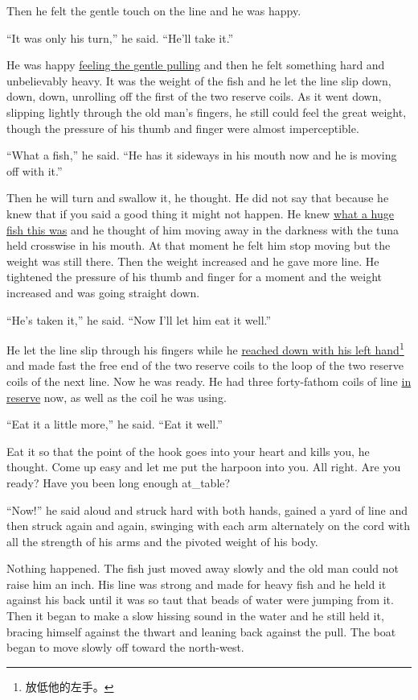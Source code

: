 Then he felt the \gls{gentle} touch on the line and he was happy.

``It was only his turn,'' he said. ``He'll take it.''

He was happy \uline{feeling the gentle pulling} and then he felt something hard
and unbelievably heavy. It was the weight of the fish and he let the line
\gls{slip} down, down, down, \gls{unrolling} off the first of the two
\gls{reserve} coils. As it went down, slipping lightly through the old man's
fingers, he still could feel the great weight, though the \gls{pressure} of
his thumb and finger were almost \gls{imperceptible}.

``What a fish,'' he said. ``He has it \gls{sideways} in his mouth now and he is moving off with it.''

Then he will turn and \gls{swallow} it, he thought. He did not say that
because he knew that if you said a good thing it might not happen. He knew
\uline{what a huge fish this was} and he thought of him moving away in the darkness
with the tuna held \gls{crosswise} in his mouth. At that moment he felt him
stop moving but the weight was still there. Then the weight increased and he
gave more line. He \gls{tightened} the pressure of his thumb and finger for a
moment and the weight increased and was going straight down.

``He's taken it,'' he said. ``Now I'll let him eat it well.''

He let the line slip through his fingers while he \uline{reached down with
  his left hand}\footnote{放低他的左手。} and made fast the free end of the
two reserve coils to the loop of the two reserve coils of the next line. Now
he was ready. He had three forty-fathom coils of line \uline{in reserve} now,
as well as the coil he was using.

``Eat it a little more,'' he said. ``Eat it well.''

Eat it so that the point of the hook goes into your heart and kills you, he
thought. Come up easy and let me put the harpoon into you. All right. Are
you ready? Have you been long enough \gls{at_table}?

``Now!'' he said aloud and struck hard with both hands, \gls{gained} a yard
of line and then struck again and again, swinging with each arm
\gls{alternately} on the cord with all the strength of his arms and the
\gls{pivoted} weight of his body.

Nothing happened. The fish just moved away slowly and the old man could not
raise him an \gls{inch}. His line was strong and made for heavy fish and he
held it against his back until it was so taut that \glspl{bead} of
water were jumping from it. Then it began to make a slow hissing sound in
the water and he still held it, \gls{bracing} himself against the thwart and
leaning back against the pull. The boat began to move slowly off toward the
north-west.

